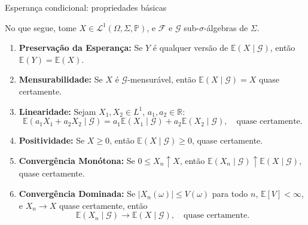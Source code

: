 \documentclass[11pt]{beamer}
\begin{document}
	\begin{frame}{Esperança condicional: propriedades básicas}
	
			No que segue, tome $X \in \mathcal{L}^1(\Omega,\Sigma,\mathbb{P})$, e $\mathcal{F}$ e $\mathcal{G}$ sub-$\sigma$-álgebras de $\Sigma$.
	\begin{lemma}
		\footnotesize
			\begin{enumerate}
			\item \textbf{Preservação da Esperança:}  
			Se \( Y \) é qualquer versão de \( \mathbb{E}(X \mid \mathcal{G}) \), então \( \mathbb{E}(Y) = \mathbb{E}(X) \).
			
			\item \textbf{Mensurabilidade:}  
			Se \( X \) é \( \mathcal{G} \)-mensurável, então \( \mathbb{E}(X \mid \mathcal{G}) = X \) quase certamente.
			
			\item \textbf{Linearidade:} Sejam $X_1, X_2 \in L^1$, $a_1,a_2\in \mathbb{R}$:
			\[
			\mathbb{E}(a_1 X_1 + a_2 X_2 \mid \mathcal{G}) = a_1 \mathbb{E}(X_1 \mid \mathcal{G}) + a_2 \mathbb{E}(X_2 \mid \mathcal{G}), \quad \text{quase certamente.}
			\]
			
			\item \textbf{Positividade:}  
			Se \( X \geq 0 \), então \( \mathbb{E}(X \mid \mathcal{G}) \geq 0 \), quase certamente.
			
			\item \textbf{Convergência Monótona:}  
			Se \( 0 \leq X_n \uparrow X \), então \( \mathbb{E}(X_n \mid \mathcal{G}) \uparrow \mathbb{E}(X \mid \mathcal{G}) \), quase certamente.
			
			\item \textbf{Convergência Dominada:}  
			Se \( |X_n(\omega)| \leq V(\omega) \) para todo \( n \), \( \mathbb{E}[V] < \infty \), e \( X_n \to X \) quase certamente, então
			\[
			\mathbb{E}(X_n \mid \mathcal{G}) \to \mathbb{E}(X \mid \mathcal{G}), \quad \text{quase certamente.}
			\]
			
		
		\end{enumerate}
	\end{lemma}
		
				
							
				\end{frame}
	
\end{document}
